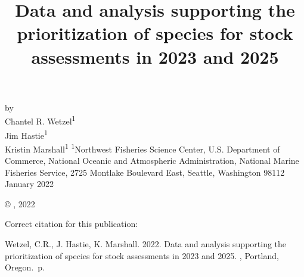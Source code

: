 \documentclass[11pt,
  english,
  a4paper,
]{article}
\date{}
\newcommand{\trTitle}{Data and analysis supporting the prioritization of species for stock assessments in 2023 and 2025}
\newcommand{\trYear}{2022}
\newcommand{\trMonth}{January}
\newcommand{\trAuthsBack}{Wetzel, C.R., J. Hastie, K. Marshall}
\newcommand{\trCitation}{
\begin{hangparas}{1em}{1}
\trAuthsBack{}. \trYear{}. \trTitle{}. \glsentrylong{pfmc}, Portland, Oregon. \pageref{LastPage}{}\,p.
\end{hangparas}}
\begin{document}

\renewcommand*{\thefootnote}{\fnsymbol{footnote}}

\small
\thispagestyle{empty}
\noindent
\begin{center}
\title{Data and analysis supporting the prioritization of species for stock assessments in 2023 and 2025}
\vspace{1.5cm}
{\Large\textbf{}}
\vfill
by\\
Chantel R. Wetzel\textsuperscript{1}\\
Jim Hastie\textsuperscript{1}\\
Kristin Marshall\textsuperscript{1}\vfill
\textsuperscript{1}Northwest Fisheries Science Center, U.S. Department of Commerce, National Oceanic and Atmospheric Administration, National Marine Fisheries Service, 2725 Montlake Boulevard East, Seattle, Washington 98112\vfill
\trMonth{} \trYear{}
\end{center}
\clearpage

\thispagestyle{empty}
\vspace*{\fill}
\begin{center}
\copyright{} , \trYear{}\\
\end{center}
\par
\bigskip
\noindent
Correct citation for this publication:
\bigskip
\par
\trCitation{}
\clearpage


\tableofcontents\clearpage
\label{TRlastRoman}
\clearpage

\newpage
\thispagestyle{empty} %

\pagestyle{plain}  %
\renewcommand*{\thefootnote}{\arabic{footnote}}  %
\setcounter{footnote}{0}  %
\renewcommand{\headrulewidth}{0.5pt}
\renewcommand{\footrulewidth}{0.5pt}
\end{document}
